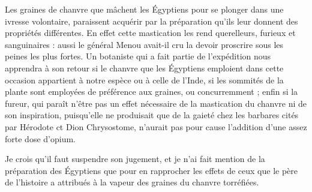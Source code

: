 \documentclass[a4paper, 11pt, oneside, polutonikogreek]{article}
\begin{document}
Les graines de chanvre que mâchent les Égyptiens pour se plonger dans une ivresse volontaire, paraissent acquérir par la préparation qu'ils leur donnent des propriétés différentes. En effet cette mastication les rend querelleurs, furieux et sanguinaires : aussi le général Menou avait-il cru la devoir proscrire sous les peines les plus fortes. Un botaniste qui a fait partie de l'expédition nous apprendra à son retour si le chanvre que les Égyptiens emploient dans cette occasion appartient à notre espèce ou à celle de l'Inde, si les sommités de la plante sont employées de préférence aux graines, ou concurremment ; enfin si la fureur, qui paraît n'être pas un effet nécessaire de la mastication du chanvre ni de son inspiration, puisqu'elle ne produisait que de la gaieté chez les barbares cités par Hérodote ct Dion Chrysostome, n'aurait pas pour cause l'addition d'une assez forte dose d'opium.

Je crois qu'il faut suspendre son jugement, et je n'ai fait mention de la préparation des Égyptiens que pour en rapprocher les effets de ceux que le père de l'histoire a attribués à la vapeur des graines du chanvre torréfiées.
\end{document}
